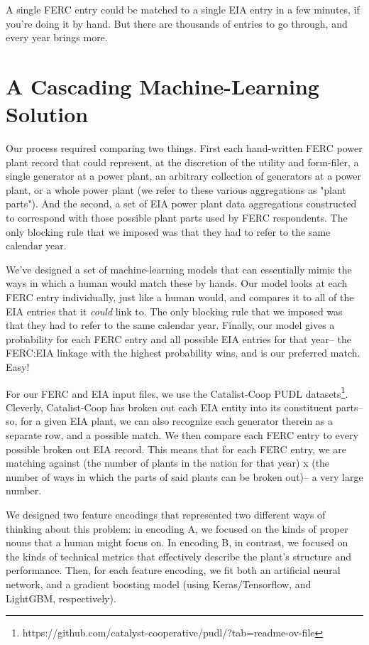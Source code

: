 \documentclass{article}
\begin{document}
A single FERC entry could be matched to a single EIA entry in a few minutes, if you're doing it by hand. 
But there are thousands of entries to go through, and every year brings more.

\section{A Cascading Machine-Learning Solution}

Our process required comparing two things. 
First each hand-written FERC power plant record that could represent, at the discretion of the utility and form-filer, a single generator at a power plant, an arbitrary collection of generators at a power plant, or a whole power plant (we refer to these various aggregations as "plant parts"). 
And the second, a set of EIA power plant data aggregations constructed to correspond with those possible plant parts used by FERC respondents. 
The only blocking rule that we imposed was that they had to refer to the same calendar year. 

We've designed a set of machine-learning models that can essentially mimic the ways in which a human would match these by hands.
Our model looks at each FERC entry individually, just like a human would, and compares it to all of the EIA entries that it \emph{could} link to.
The only blocking rule that we imposed was that they had to refer to the same calendar year. 
Finally, our model gives a probability for each FERC entry and all possible EIA entries for that year-- the FERC:EIA linkage with the highest probability wins, and is our preferred match. 
Easy!

For our FERC and EIA input files, we use the Catalist-Coop PUDL datasets\footnote{https://github.com/catalyst-cooperative/pudl/?tab=readme-ov-file}. 
Cleverly, Catalist-Coop has broken out each EIA entity into its constituent parts-- so, for a given EIA plant, we can also recognize each generator therein as a separate row, and a possible match. 
We then compare each FERC entry to every possible broken out EIA record. 
This means that for each FERC entry, we are matching against (the number of plants in the nation for that year) x (the number of ways in which the parts of said plants can be broken out)-- a very large number.

We designed two feature encodings that represented two different ways of thinking about this problem: in encoding A, we focused on the kinds of proper nouns that a human might focus on. 
In encoding B, in contrast, we focused on the kinds of technical metrics that effectively describe the plant’s structure and performance. 
Then, for each feature encoding, we fit both an artificial neural network, and a gradient boosting model (using Keras/Tensorflow, and LightGBM, respectively).
\end{document}
